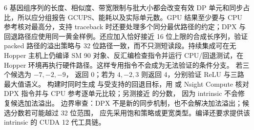 \begin{solutionexercise}{6}
基因组序列的长度、相似度、带宽限制与批大小都会改变有效 DP 单元和同步占比，所以应分组报告 GCUPS、能耗以及实际单元数。GPU 结果至少要与 CPU 参考核对最高分，支持 traceback 时还要处理多个同分最优路径的约定；DPX 与回退路径应使用同一黄金样例。还应加入恰好接近 16 位上限的合成长序列，验证 packed 路径的溢出策略与 32 位路径一致，而不只测短读段。持续集成可在无 Hopper 主机上仍编译 SM 90 对象、反汇编检查指令并运行 CPU/回退测试，在 Hopper 环境再执行硬件路径。这样专用指令不会成为无法验证的条件分支。
\variantheading 若三个候选为 $-7,-2,-9$， 返回 0；若为
$4,-2,3$ 则返回 4，分别验证 ReLU 与三路最大值语义。
\practiceheading 构建时同时生成  与受支持的回退目标，用  或
Nsight Compute 核对 DPX 指令并与 CPU 参考逐单元比较；另测接近  的分数，
因为 intrinsic 不会修复候选加法溢出。
边界审查：DPX 不是新的同步机制，也不会解决加法溢出；候选分数若可能越过 32 位范围，
应先采用饱和策略或更宽类型。编译还要求提供该 intrinsic 的 CUDA 12 代工具链。
\end{solutionexercise}
